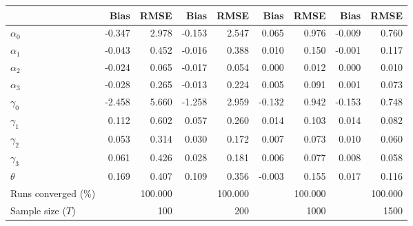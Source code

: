 
\begin{tabular}[t]{lrrrrrrrr}
\toprule
  & Bias & RMSE & Bias & RMSE & Bias & RMSE & Bias & RMSE\\
\midrule
$\alpha_{0}$ & -0.347 & 2.978 & -0.153 & 2.547 & 0.065 & 0.976 & -0.009 & 0.760\\
$\alpha_{1}$ & -0.043 & 0.452 & -0.016 & 0.388 & 0.010 & 0.150 & -0.001 & 0.117\\
$\alpha_{2}$ & -0.024 & 0.065 & -0.017 & 0.054 & 0.000 & 0.012 & 0.000 & 0.010\\
$\alpha_{3}$ & -0.028 & 0.265 & -0.013 & 0.224 & 0.005 & 0.091 & 0.001 & 0.073\\
$\gamma_{0}$ & -2.458 & 5.660 & -1.258 & 2.959 & -0.132 & 0.942 & -0.153 & 0.748\\
$\gamma_{1}$ & 0.112 & 0.602 & 0.057 & 0.260 & 0.014 & 0.103 & 0.014 & 0.082\\
$\gamma_{2}$ & 0.053 & 0.314 & 0.030 & 0.172 & 0.007 & 0.073 & 0.010 & 0.060\\
$\gamma_{3}$ & 0.061 & 0.426 & 0.028 & 0.181 & 0.006 & 0.077 & 0.008 & 0.058\\
$\theta$ & 0.169 & 0.407 & 0.109 & 0.356 & -0.003 & 0.155 & 0.017 & 0.116\\
Runs converged (\%) &  & 100.000 &  & 100.000 &  & 100.000 &  & 100.000\\
Sample size ($T$) &  & 100 &  & 200 &  & 1000 &  & 1500\\
\bottomrule
\end{tabular}
